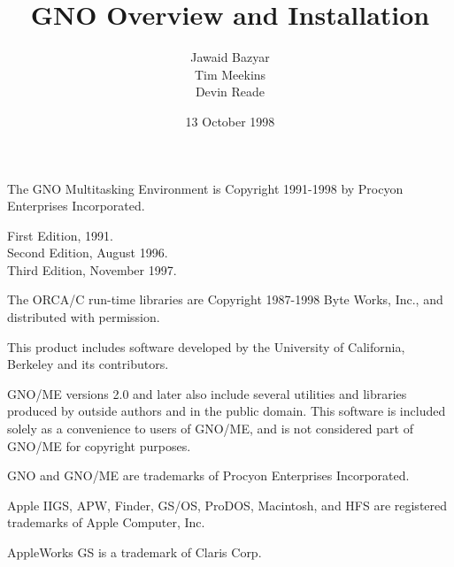 \documentclass{report}
\begin{document}
\title{GNO Overview and Installation}
\author{Jawaid Bazyar \\ Tim Meekins \\ Devin Reade}
\date{13 October 1998}
\maketitle


\nocite{*}

%
%
\newcommand{\faqhtml}[1]{\htlink{#1}
	{http://www.gno.org/~gno/FAQ.html}}
\newcommand{\faqtext}[1]{\htlink{#1}
	{ftp://ftp.gno.org/pub/apple2/gs.specific/gno/doc/faq/CURRENT}}
\newcommand{\gnodocs}[1]{\htlink{#1}
	{http://www.gno.org/~gno}}
\newcommand{\delphi}[1]{\htlink{#1}
	{http://delphi.com}}
\newcommand{\overview}[1]{\htlink{#1}
	{http://www.gno.org/~gno/intro.html}}
\newcommand{\kernel}[1]{\htlink{#1}
	{http://www.gno.org/~gno/kern.html}}
\newcommand{\gsh}[1]{\htlink{#1}
	{http://www.gno.org/~gno/gsh.html}}
\newcommand{\manpages}[1]{\htlink{#1}
	{http://www.gno.org/~gno/manindex.html}}
\parindent=0pt
\parskip=1pc

The GNO Multitasking Environment is Copyright 1991-1998 by
Procyon Enterprises Incorporated.

\begin{flushleft}
First Edition, 1991. \\
Second Edition, August 1996. \\
Third Edition, November 1997.
\end{flushleft}

The ORCA/C run-time libraries are Copyright 1987-1998 Byte Works, Inc.,
and distributed with permission.

This product includes software developed by the University of California,
Berkeley and its contributors.

GNO/ME versions 2.0 and later also include several utilities and
libraries produced by
outside authors and in the public domain. This software is included
solely as a convenience to users of GNO/ME, and is not considered part
of GNO/ME for copyright purposes.

GNO and GNO/ME are trademarks of Procyon Enterprises Incorporated.

Apple IIGS, APW, Finder, GS/OS, ProDOS, Macintosh, and HFS are registered
trademarks of Apple Computer, Inc.

AppleWorks GS is a trademark of Claris Corp.
\end{document}
